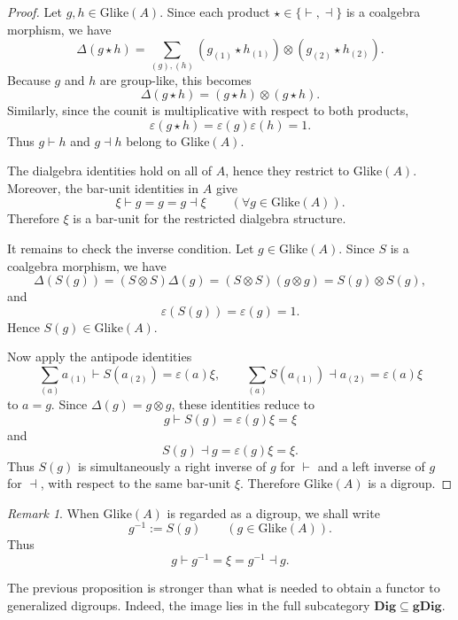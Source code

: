 \documentclass[11pt]{article}
\theoremstyle{plain}
\theoremstyle{definition}
\theoremstyle{remark}
\newtheorem{remark}[theorem]{Remark}
\begin{document}
	\begin{proof}
		Let \(g,h\in\mathrm{Glike}(A)\). Since each product
		\(\star\in\{\vdash,\dashv\}\) is a coalgebra morphism, we have
		\[
		\Delta(g\star h)
		=
		\sum_{(g),(h)}
		(g_{(1)}\star h_{(1)})\otimes(g_{(2)}\star h_{(2)}).
		\]
		Because \(g\) and \(h\) are group-like, this becomes
		\[
		\Delta(g\star h)
		=
		(g\star h)\otimes(g\star h).
		\]
		Similarly, since the counit is multiplicative with respect to both products,
		\[
		\varepsilon(g\star h)=\varepsilon(g)\varepsilon(h)=1.
		\]
		Thus \(g\vdash h\) and \(g\dashv h\) belong to \(\mathrm{Glike}(A)\).
		
		The dialgebra identities hold on all of \(A\), hence they restrict to
		\(\mathrm{Glike}(A)\). Moreover, the bar-unit identities in \(A\) give
		\[
		\xi\vdash g=g=g\dashv \xi
		\qquad
		(\forall g\in\mathrm{Glike}(A)).
		\]
		Therefore \(\xi\) is a bar-unit for the restricted dialgebra structure.
		
		It remains to check the inverse condition. Let \(g\in\mathrm{Glike}(A)\).
		Since \(S\) is a coalgebra morphism, we have
		\[
		\Delta(S(g))
		=
		(S\otimes S)\Delta(g)
		=
		(S\otimes S)(g\otimes g)
		=
		S(g)\otimes S(g),
		\]
		and
		\[
		\varepsilon(S(g))=\varepsilon(g)=1.
		\]
		Hence \(S(g)\in\mathrm{Glike}(A)\).
		
		Now apply the antipode identities
		\[
		\sum_{(a)}a_{(1)}\vdash S(a_{(2)})
		=
		\varepsilon(a)\xi,
		\qquad
		\sum_{(a)}S(a_{(1)})\dashv a_{(2)}
		=
		\varepsilon(a)\xi
		\]
		to \(a=g\). Since \(\Delta(g)=g\otimes g\), these identities reduce to
		\[
		g\vdash S(g)=\varepsilon(g)\xi=\xi
		\]
		and
		\[
		S(g)\dashv g=\varepsilon(g)\xi=\xi.
		\]
		Thus \(S(g)\) is simultaneously a right inverse of \(g\) for \(\vdash\)
		and a left inverse of \(g\) for \(\dashv\), with respect to the same
		bar-unit \(\xi\). Therefore \(\mathrm{Glike}(A)\) is a digroup.
	\end{proof}
	
	\begin{remark}\label{rem:inverse-notation-glike}
		When \(\mathrm{Glike}(A)\) is regarded as a digroup, we shall write
		\[
		g^{-1}:=S(g)
		\qquad
		(g\in\mathrm{Glike}(A)).
		\]
		Thus
		\[
		g\vdash g^{-1}=\xi=g^{-1}\dashv g.
		\]
	\end{remark}
	
	The previous proposition is stronger than what is needed to obtain a functor
	to generalized digroups. Indeed, the image lies in the full subcategory
	\(\mathbf{Dig}\subseteq\mathbf{gDig}\).
	
\end{document}
